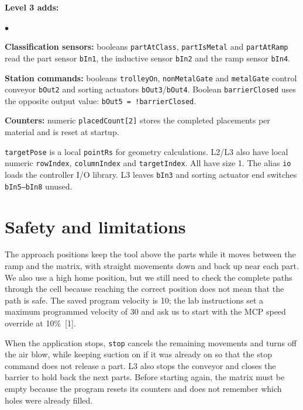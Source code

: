 \documentclass[11pt,a4paper]{article}
\newenvironment{compactitems}{\begin{list}{$\bullet$}{\setlength{\leftmargin}{1.2em}\setlength{\itemsep}{2pt}\setlength{\parsep}{0pt}\setlength{\topsep}{4pt}}\raggedright}{\end{list}}
\begin{document}
\begin{samepage}
\textbf{Level 3 adds:}
\begin{compactitems}
\item \textbf{Classification sensors:} booleans \texttt{partAtClass}, \texttt{partIsMetal} and \texttt{partAtRamp} read the part sensor \texttt{bIn1}, the inductive sensor \texttt{bIn2} and the ramp sensor \texttt{bIn4}.
\item \textbf{Station commands:} booleans \texttt{trolleyOn}, \texttt{nonMetalGate} and \texttt{metalGate} control conveyor \texttt{bOut2} and sorting actuators \texttt{bOut3}/\texttt{bOut4}. Boolean \texttt{barrierClosed} uses the opposite output value: \texttt{bOut5 = !barrierClosed}.
\item \textbf{Counters:} numeric \texttt{placedCount[2]} stores the completed placements per material and is reset at startup.
\end{compactitems}
\end{samepage}

\texttt{targetPose} is a local \texttt{pointRs} for geometry calculations. L2/L3 also have local numeric \texttt{rowIndex}, \texttt{columnIndex} and \texttt{targetIndex}. All have size 1. The alias \texttt{io} loads the controller I/O library. L3 leaves \texttt{bIn3} and sorting actuator end switches \texttt{bIn5--bIn8} unused.

\section{Safety and limitations}
The approach positions keep the tool above the parts while it moves between the ramp and the matrix, with straight movements down and back up near each part. We also use a high home position, but we still need to check the complete paths through the cell because reaching the correct position does not mean that the path is safe. The saved program velocity is 10; the lab instructions set a maximum programmed velocity of 30 and ask us to start with the MCP speed override at 10\%~[1].

When the application stops, \texttt{stop} cancels the remaining movements and turns off the air blow, while keeping suction on if it was already on so that the stop command does not release a part. L3 also stops the conveyor and closes the barrier to hold back the next parts. Before starting again, the matrix must be empty because the program resets its counters and does not remember which holes were already filled.
\end{document}
